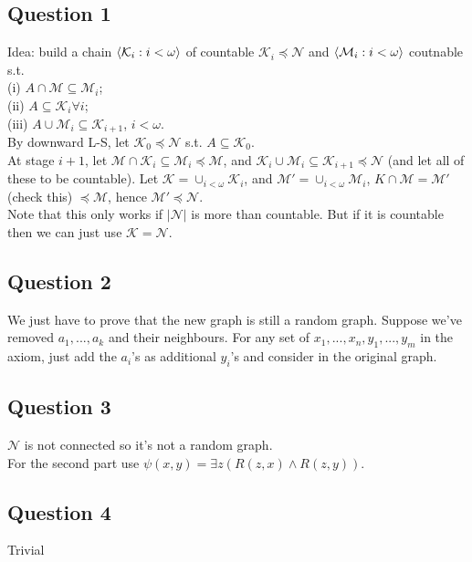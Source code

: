 \documentclass[a4paper]{article}
\begin{document}
\subsection{Question 1}
Idea: build a chain $\langle \mathcal{K}_i:i < \omega\rangle$ of countable $\mathcal{K}_i \preccurlyeq \mathcal{N}$ and $\langle \mathcal{M}_i : i < \omega \rangle$ coutnable s.t. \\
(i) $A \cap \mathcal{M} \subseteq \mathcal{M}_i$;\\
(ii) $A \subseteq \mathcal{K}_i \forall i$;\\
(iii) $A \cup \mathcal{M}_i \subseteq \mathcal{K}_{i+1}$, $i < \omega$.\\
By downward L-S, let $\mathcal{K}_0 \preccurlyeq \mathcal{N}$ s.t. $A \subseteq \mathcal{K}_0$.\\
At stage $i+1$, let $\mathcal{M} \cap \mathcal{K}_i \subseteq \mathcal{M}_i \preccurlyeq\mathcal{M}$, and $\mathcal{K}_i \cup \mathcal{M}_i \subseteq \mathcal{K}_{i+1} \preccurlyeq \mathcal{N}$ (and let all of these to be countable).
Let $\mathcal{K} = \cup_{i < \omega} \mathcal{K}_i$, and $\mathcal{M}' = \cup_{i < \omega} \mathcal{M}_i$, $K \cap \mathcal{M} = \mathcal{M}'$ (check this) $\preccurlyeq \mathcal{M}$, hence $\mathcal{M}' \preccurlyeq \mathcal{N}$.\\
Note that this only works if $|\mathcal{N}|$ is more than countable. But if it is countable then we can just use $\mathcal{K} = \mathcal{N}$.

\subsection{Question 2}
We just have to prove that the new graph is still a random graph. Suppose we've removed $a_1,...,a_k$ and their neighbours. For any set of $x_1,...,x_n,y_1,...,y_m$ in the axiom, just add the $a_i$'s as additional $y_i$'s and consider in the original graph.

\subsection{Question 3}
$\mathcal{N}$ is not connected so it's not a random graph.\\
For the second part use $\psi(x,y) = \exists z(R(z,x) \wedge R(z,y))$.

\subsection{Question 4}
Trivial
\end{document}
